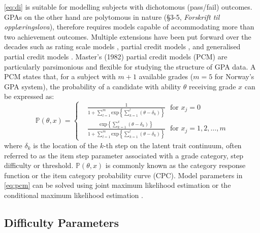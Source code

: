 \documentclass[
    a4paper,            %
    11pt,               %
    stu,                %
    donotrepeattitle,   %
    noextraspace,       %
    floatsintext,       %
    biblatex,           %
    colorlinks=true,        %
    linkcolor=red,          %
    anchorcolor=black,      %
    citecolor=blue,         %
    urlcolor=blue,          %
    bookmarks=true,         %
    bookmarksopen=false,    %
    bookmarksnumbered=true  %
]{apa7}
\newcommand{\p}[1]{\mathbb{P}\left(#1\right)}
\renewcommand{\exp}[1]{\mathrm{exp}\left\{#1\right\}}
\begin{document}
\cref{eq:di} is suitable for modelling subjects with dichotomous (pass/fail) outcomes. GPAs on the other hand are polytomous in nature (\S 3-5, \textit{Forskrift til oppl{\ae}ringslova}), therefore requires models capable of accommodating more than two achievement outcomes. Multiple extensions have been put forward over the decades such as rating scale models \parencite{rasch:1980}, partial credit models \parencite{masters:1982}, and generalised partial credit models \parencite{muraki:1992}. Master's (1982) partial credit models (PCM) are particularly parsimonious and flexible for studying the structure of GPA data. A PCM states that, for a subject with $m+1$ available grades ($m=5$ for Norway's GPA system), the probability of a candidate with ability $\theta$ receiving grade $x$ can be expressed as:
\begin{equation}\label{eq:pcm}
    \p{\theta, x}=
    \left\{
        \begin{aligned}
            &\frac{1}{1 + \sum_{l=1}^m \exp{ \sum_{k=1}^l (\theta - \delta_k) }}\ \ \ \text{for } x_j = 0\\
            &\frac{ \exp{ \sum_{k=1}^x (\theta - \delta_k) } }{1 + \sum_{l=1}^m \exp{ \sum_{k=1}^l (\theta - \delta_k) }}\ \ \ \text{for } x_j = 1,2,\dots,m
        \end{aligned}
    \right.
\end{equation}
where $\delta_k$ is the location of the $k$-th step on the latent trait continuum, often referred to as the item step parameter associated with a grade category, step difficulty or threshold. $\p{\theta, x}$ is commonly known as the category response function or the item category probability curve (CPC). Model parameters in \cref{eq:pcm} can be solved using joint maximum likelihood estimation \parencite{molenaar:1995} or the conditional maximum likelihood estimation \parencite{andersen:1972}.

\subsection{Difficulty Parameters}
\end{document}
